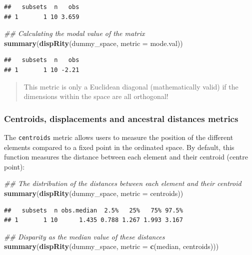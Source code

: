 \documentclass[]{book}
\newenvironment{Shaded}{\begin{snugshade}}{\end{snugshade}}
\newcommand{\CommentTok}[1]{\textcolor[rgb]{0.56,0.35,0.01}{\textit{#1}}}
\newcommand{\DataTypeTok}[1]{\textcolor[rgb]{0.13,0.29,0.53}{#1}}
\newcommand{\KeywordTok}[1]{\textcolor[rgb]{0.13,0.29,0.53}{\textbf{#1}}}
\newcommand{\NormalTok}[1]{#1}
\begin{document}
\begin{verbatim}
##   subsets  n   obs
## 1       1 10 3.659
\end{verbatim}

\begin{Shaded}
\begin{Highlighting}[]
\CommentTok{## Calculating the modal value of the matrix}
\KeywordTok{summary}\NormalTok{(}\KeywordTok{dispRity}\NormalTok{(dummy_space, }\DataTypeTok{metric =}\NormalTok{ mode.val))}
\end{Highlighting}
\end{Shaded}

\begin{verbatim}
##   subsets  n   obs
## 1       1 10 -2.21
\end{verbatim}

\begin{quote}
This metric is only a Euclidean diagonal (mathematically valid) if the dimensions within the space are all orthogonal!
\end{quote}

\hypertarget{centroids}{%
\subsubsection{Centroids, displacements and ancestral distances metrics}\label{centroids}}

The \texttt{centroids} metric allows users to measure the position of the different elements compared to a fixed point in the ordinated space.
By default, this function measures the distance between each element and their centroid (centre point):

\begin{Shaded}
\begin{Highlighting}[]
\CommentTok{## The distribution of the distances between each element and their centroid}
\KeywordTok{summary}\NormalTok{(}\KeywordTok{dispRity}\NormalTok{(dummy_space, }\DataTypeTok{metric =}\NormalTok{ centroids))}
\end{Highlighting}
\end{Shaded}

\begin{verbatim}
##   subsets  n obs.median  2.5%   25%   75% 97.5%
## 1       1 10      1.435 0.788 1.267 1.993 3.167
\end{verbatim}

\begin{Shaded}
\begin{Highlighting}[]
\CommentTok{## Disparity as the median value of these distances}
\KeywordTok{summary}\NormalTok{(}\KeywordTok{dispRity}\NormalTok{(dummy_space, }\DataTypeTok{metric =} \KeywordTok{c}\NormalTok{(median, centroids)))}
\end{Highlighting}
\end{Shaded}
\end{document}
